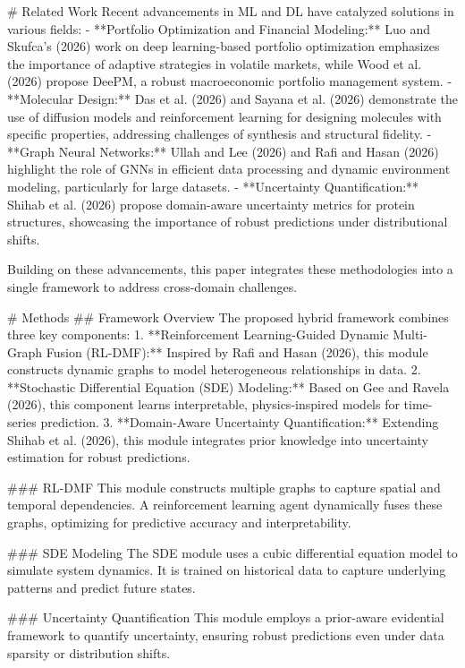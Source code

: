 # Related Work
Recent advancements in ML and DL have catalyzed solutions in various fields:
- **Portfolio Optimization and Financial Modeling:** Luo and Skufca’s (2026) work on deep learning-based portfolio optimization emphasizes the importance of adaptive strategies in volatile markets, while Wood et al. (2026) propose DeePM, a robust macroeconomic portfolio management system.
- **Molecular Design:** Das et al. (2026) and Sayana et al. (2026) demonstrate the use of diffusion models and reinforcement learning for designing molecules with specific properties, addressing challenges of synthesis and structural fidelity.
- **Graph Neural Networks:** Ullah and Lee (2026) and Rafi and Hasan (2026) highlight the role of GNNs in efficient data processing and dynamic environment modeling, particularly for large datasets.
- **Uncertainty Quantification:** Shihab et al. (2026) propose domain-aware uncertainty metrics for protein structures, showcasing the importance of robust predictions under distributional shifts.

Building on these advancements, this paper integrates these methodologies into a single framework to address cross-domain challenges.

# Methods
## Framework Overview
The proposed hybrid framework combines three key components:
1. **Reinforcement Learning-Guided Dynamic Multi-Graph Fusion (RL-DMF):** Inspired by Rafi and Hasan (2026), this module constructs dynamic graphs to model heterogeneous relationships in data.
2. **Stochastic Differential Equation (SDE) Modeling:** Based on Gee and Ravela (2026), this component learns interpretable, physics-inspired models for time-series prediction.
3. **Domain-Aware Uncertainty Quantification:** Extending Shihab et al. (2026), this module integrates prior knowledge into uncertainty estimation for robust predictions.

### RL-DMF
This module constructs multiple graphs to capture spatial and temporal dependencies. A reinforcement learning agent dynamically fuses these graphs, optimizing for predictive accuracy and interpretability.

### SDE Modeling
The SDE module uses a cubic differential equation model to simulate system dynamics. It is trained on historical data to capture underlying patterns and predict future states.

### Uncertainty Quantification
This module employs a prior-aware evidential framework to quantify uncertainty, ensuring robust predictions even under data sparsity or distribution shifts.

